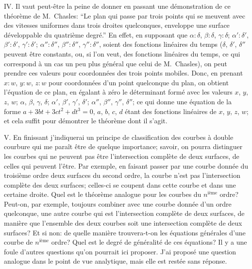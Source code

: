 \documentclass[11pt]{article}
\begin{document}
\medskip
\noindent\textsc{IV.} Il vaut peut-\^etre la peine de donner en passant une d\'emonstration de ce
th\'eor\`eme de M.~Chasles: ``Le plan qui passe par trois points qui se meuvent avec
des vitesses uniformes dans trois droites quelconques, enveloppe une surface d\'eveloppable
du quatri\`eme degr\'e.'' En effet, en supposant que $\alpha : \delta$, $\beta : \delta$, $\gamma : \delta$; $\alpha' : \delta'$, $\beta' : \delta'$, $\gamma' : \delta'$;
$\alpha'' : \delta''$, $\beta'' : \delta''$, $\gamma'' : \delta''$, soient des fonctions lin\'eaires du temps ($\delta$, $\delta'$, $\delta''$ peuvent \^etre
constants, ou, si l'on veut, des fonctions lin\'eaires du temps, ce qui correspond \`a un
cas un peu plus g\'en\'eral que celui de M.~Chasles), on peut prendre ces valeurs pour
coordonn\'ees des trois points mobiles. Donc, en prenant $x : w$, $y : w$, $z : w$ pour coordonn\'ees
d'un point quelconque du plan, on obtient l'\'equation de ce plan, en \'egalant \`a z\'ero
le d\'eterminant form\'e avec les valeurs $x$, $y$, $z$, $w$; $\alpha$, $\beta$, $\gamma$, $\delta$; $\alpha'$, $\beta'$, $\gamma'$, $\delta'$; $\alpha''$, $\beta''$, $\gamma''$, $\delta''$;
ce qui donne une \'equation de la forme $a + 3 b t + 3 c t^{2} + d t^{3} = 0$, $a$, $b$, $c$, $d$ \'etant des fonc\-tions
lin\'eaires de $x$, $y$, $z$, $w$; et cela suffit pour d\'emontrer le th\'eor\`eme dont il s'agit.

\medskip
\noindent\textsc{V.} En finissant j'indiquerai un principe de classification des courbes \`a double
courbure qui me para\^it \^etre de quelque importance; savoir, on pourra distinguer les
courbes qui ne peuvent pas \^etre l'intersection compl\`ete de deux surfaces, de celles qui
peuvent l'\^etre. Par exemple, en faisant passer par une courbe donn\'ee du troisi\`eme ordre
deux surfaces du second ordre, la courbe n'est pas l'intersection compl\`ete des deux
surfaces; celles-ci se coupent dans cette courbe et dans une certaine droite. Quel est
le th\'eor\`eme analogue pour les courbes du $n^{\text{i\`eme}}$ ordre? Peut-on, par exemple, toujours
combiner avec une courbe donn\'ee d'un ordre quelconque, une autre courbe qui est
l'intersection compl\`ete de deux surfaces, de mani\`ere que l'ensemble des deux courbes
soit une intersection compl\`ete de deux surfaces? Et si non: de quelle mani\`ere trouvera-t-on
les \'equations g\'en\'erales d'une courbe de $n^{\text{i\`eme}}$ ordre? Quel est le degr\'e de g\'en\'eralit\'e
de ces \'equations? Il y a une foule d'autres questions qu'on pourrait ici proposer.
J'ai propos\'e une question analogue dans le point de vue analytique, mais elle est
rest\'ee sans r\'eponse.
\end{document}

